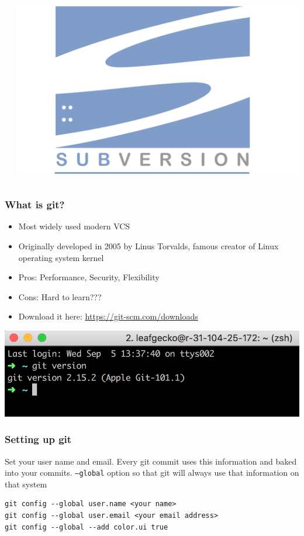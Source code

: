 \documentclass[12pt]{beamer}
\begin{document}
\begin{frame}
\begin{columns}
\begin{column}{0.33\linewidth}
	\end{column}
	\begin{column}{0.33\linewidth}
		\includegraphics[width=0.8\linewidth]{subversion_Logo}
	\end{column}
\end{columns}
\end{frame}

\begin{frame}
\frametitle{What is git?}
\begin{itemize}
	\item Most widely used modern VCS
	\item Originally developed in 2005 by Linus Torvalds, famous creator of Linux operating system kernel
	\item Pros: Performance, Security, Flexibility
	\item Cons: Hard to learn???
	\item Download it here: \url{https://git-scm.com/downloads}
\end{itemize}
\begin{center}	
	\includegraphics[width=0.5\linewidth]{git_screenshot}
\end{center}
\end{frame}

\begin{frame}[fragile]
\frametitle{Setting up git}
Set your user name and email. Every git commit uses this information and baked into your commits. \texttt{--global} option so that git will always use that information on that system
\begin{verbatim}
git config --global user.name <your name>
git config --global user.email <your email address>
git config --global --add color.ui true
\end{verbatim}
\end{frame}
\end{document}
